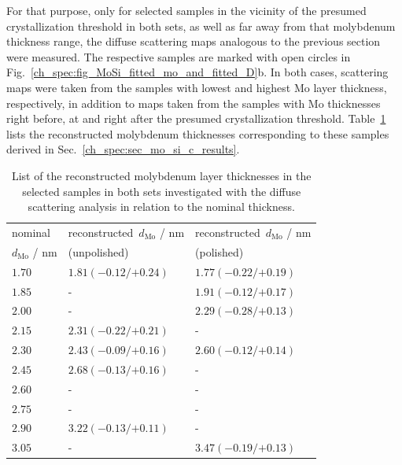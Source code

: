 For that purpose, only for selected samples in the vicinity of the presumed crystallization threshold in both sets, as well as far away from that molybdenum thickness range, the diffuse scattering maps analogous to the previous section were measured. The respective samples are marked with open circles in Fig.~\ref{ch_spec:fig_MoSi_fitted_mo_and_fitted_D}b. In both cases, scattering maps were taken from the samples with lowest and highest Mo layer thickness, respectively, in addition to maps taken from the samples with Mo thicknesses right before, at and right after the presumed crystallization threshold. Table~\ref{ch_diff:tbl_mo_si_thickness_mcmc_result_selected_samples} lists the reconstructed molybdenum thicknesses corresponding to these samples derived in Sec.~\ref{ch_spec:sec_mo_si_c_results}.
\begin{table}[htbp]
\centering
\caption[List of the reconstructed molybdenum layer thicknesses in the selected samples in both Mo/Si/C sets.]{List of the reconstructed molybdenum layer thicknesses in the selected samples in both sets investigated with the diffuse scattering analysis in relation to the nominal thickness.}
\label{ch_diff:tbl_mo_si_thickness_mcmc_result_selected_samples}
\begin{tabular}{@{}lll@{}}
\toprule
nominal &reconstructed~$d_\text{Mo}$ / nm&reconstructed~$d_\text{Mo}$ / nm\\ 
$d_\text{Mo}$ / nm&(unpolished) & (polished) \\
\midrule
$1.70$ &$1.81({-0.12}/{+0.24})$  &$1.77({-0.22}/{+0.19})$ \\
$1.85$ &-  &$1.91({-0.12}/{+0.17})$ \\
$2.00$ &-  &$2.29({-0.28}/{+0.13})$ \\
$2.15$ &$2.31({-0.22}/{+0.21})$  &- \\
$2.30$ &$2.43({-0.09}/{+0.16})$   &$2.60({-0.12}/{+0.14})$ \\
$2.45$ &$2.68({-0.13}/{+0.16})$  &- \\
$2.60$ &- &- \\
$2.75$ &-  &- \\
$2.90$ &$3.22({-0.13}/{+0.11})$ &- \\
$3.05$ &-  & $3.47({-0.19}/{+0.13})$ \\
 \bottomrule
\end{tabular}
\end{table}

